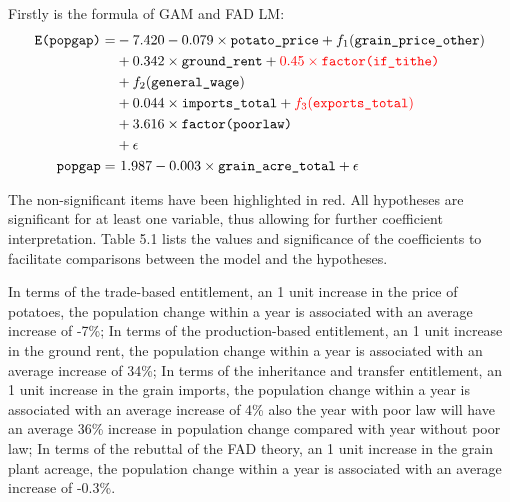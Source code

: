Firstly is the formula of GAM and FAD LM:
\vspace{-14pt}
\begin{align*}
\texttt{E(popgap)} = & - 7.420 - 0.079 \times \texttt{potato\_price} + f_1(\texttt{grain\_price\_other}) \\
                & + 0.342 \times \texttt{ground\_rent} + \textcolor{red}{0.45 \times \texttt{factor(if\_tithe)}} \\
                & + f_2(\texttt{general\_wage})  \\
                & + 0.044 \times \texttt{imports\_total} + \textcolor{red}{f_3(\texttt{exports\_total})}\\
                & + 3.616 \times \texttt{factor(poorlaw)} \\
                & + \epsilon \\
\texttt{popgap} = & \ 1.987 - 0.003 \times \texttt{grain\_acre\_total} + \epsilon
\end{align*}

The non-significant items have been highlighted in red. All hypotheses are significant for at least one variable, thus allowing for further coefficient interpretation. Table 5.1 lists the values and significance of the coefficients to facilitate comparisons between the model and the hypotheses.

In terms of the trade-based entitlement, an 1 unit increase in the price of potatoes, the population change within a year is associated with an average increase of -7\%; In terms of the production-based entitlement, an 1 unit increase in the ground rent, the population change within a year is associated with an average increase of 34\%; In terms of the inheritance and transfer entitlement, an 1 unit increase in the grain imports, the population change within a year is associated with an average increase of 4\% also the year with poor law will have an average 36\% increase in population change compared with year without poor law; In terms of the rebuttal of the FAD theory, an 1 unit increase in the grain plant acreage, the population change within a year is associated with an average increase of -0.3\%.

